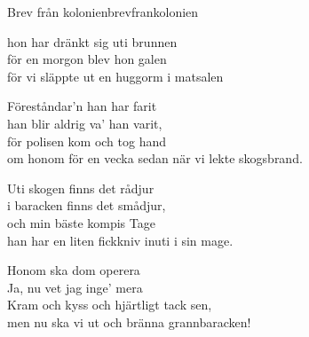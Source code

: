 \begin{song}{Brev från kolonien}{brevfrankolonien}
\begin{vers}
hon har dränkt sig uti brunnen\\
för en morgon blev hon galen\\
för vi släppte ut en huggorm i matsalen\\
\end{vers}
\begin{vers}
Föreståndar'n han har farit \\
han blir aldrig va' han varit,\\
för polisen kom och tog hand\\
om honom för en vecka sedan när vi lekte skogsbrand.\\
\end{vers}
\begin{vers}
Uti skogen finns det rådjur \\
i baracken finns det smådjur,\\
och min bäste kompis Tage\\
han har en liten fickkniv inuti i sin mage.\\
\end{vers}
\begin{vers}
Honom ska dom operera \\
Ja, nu vet jag inge' mera\\
Kram och kyss och hjärtligt tack sen,\\
men nu ska vi ut och bränna grannbaracken!\\
\end{vers}
\end{song}
